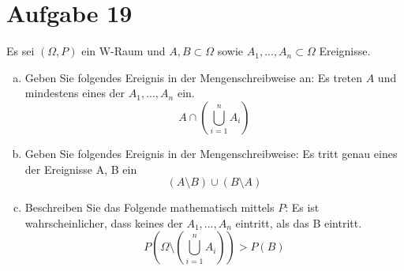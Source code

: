 \section{Aufgabe 19}
\setcounter{section}{19}

Es sei $(\Omega, P)$ ein W-Raum und $A, B \subset \Omega$ sowie $A_1,...,A_n
\subset \Omega$ Ereignisse.

\begin{enumerate}[(a)]
    \item Geben Sie folgendes Ereignis in der Mengenschreibweise an: Es treten
        $A$ und mindestens eines der $A_1,...,A_n$ ein.
        \begin{equation*}
            A \cap \left(\bigcup_{i = 1}^nA_i\right)
        \end{equation*}
    \item Geben Sie folgendes Ereignis in der Mengenschreibweise: Es tritt genau
        eines der Ereignisse A, B ein
        \begin{equation*}
            (A \setminus B) \cup (B \setminus A)
        \end{equation*}
    \item Beschreiben Sie das Folgende mathematisch mittels $P$: Es ist
        wahrscheinlicher, dass keines der $A_1,...,A_n$ eintritt, als das B
        eintritt.
        \begin{equation*}
            P\left(\Omega \setminus \left(\bigcup_{i = 1}^nA_i\right)\right) > P(B)
        \end{equation*}
\end{enumerate}
